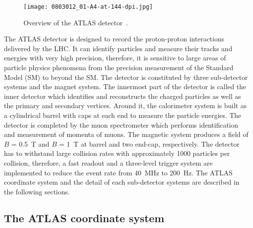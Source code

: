 \begin{figure}[htbp]
\begin{center}
\texttt{[image: 0803012\_01-A4-at-144-dpi.jpg]}
\caption{Overview of the ATLAS detector~\cite{1748-0221-3-08-S08003}.}
\label{fig:ATLAS_detector}
\end{center}
\end{figure}

The ATLAS detector is designed to record the proton-proton interactions delivered by the LHC.
It can identify particles and measure their tracks and energies with very high precision, therefore, it is sensitive to large areas of particle physics phenomena from the precision measurement of the Standard Model (SM) to beyond the SM.
The detector is constituted by three sub-detector systems and the magnet system.
The innermost part of the detector is called the inner detector which identifies and reconstructs the charged particles as well as the primary and secondary vertices.
Around it, the calorimeter system is built as a cylindrical barrel with caps at each end to measure the particle energies.
The detector is completed by the muon spectrometer which performs identification and measurement of momenta of muons.
The magnetic system produces a field of $B$ = 0.5~T and $B$ = 1~T at barrel and two end-cap, respectively.
The detector has to withstand large collision rates with approximately 1000 particles per collision, therefore, a fast readout and a three-level trigger system are implemented to reduce the event rate from 40~MHz to 200~Hz.
The ATLAS coordinate system and the detail of each sub-detector systems are described in the following sections.

\subsection{The ATLAS coordinate system}

